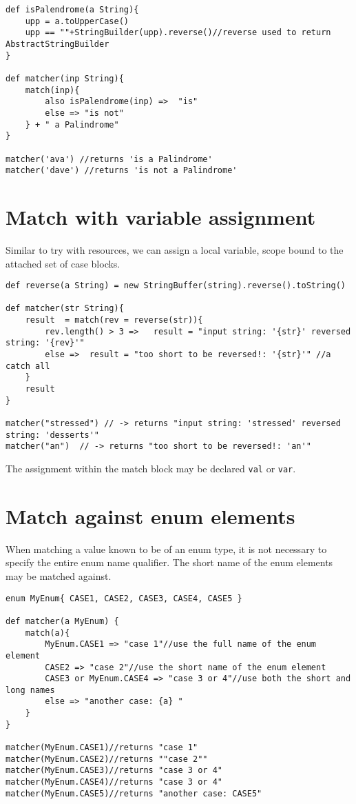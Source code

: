 \documentclass[conc-doc]{subfiles}
\begin{document}
\begin{lstlisting}
def isPalendrome(a String){
	upp = a.toUpperCase()
	upp == ""+StringBuilder(upp).reverse()//reverse used to return AbstractStringBuilder
}
	
def matcher(inp String){
	match(inp){
		also isPalendrome(inp) =>  "is" 
		else => "is not" 
	} + " a Palindrome"
}

matcher('ava') //returns 'is a Palindrome'
matcher('dave') //returns 'is not a Palindrome'
\end{lstlisting}

\section{Match with variable assignment}
Similar to try with resources, we can assign a local variable, scope bound to the attached set of case blocks.

\begin{lstlisting}
def reverse(a String) = new StringBuffer(string).reverse().toString()

def matcher(str String){
	result  = match(rev = reverse(str)){
		rev.length() > 3 =>   result = "input string: '{str}' reversed string: '{rev}'" 
		else =>  result = "too short to be reversed!: '{str}'" //a catch all
	}
	result
}

matcher("stressed") // -> returns "input string: 'stressed' reversed string: 'desserts'"
matcher("an")  // -> returns "too short to be reversed!: 'an'"
\end{lstlisting}

The assignment within the match block may be declared \lstinline{val} or \lstinline{var}.

\section{Match against enum elements}
When matching a value known to be of an enum type, it is not necessary to specify the entire enum name qualifier. The short name of the enum elements may be matched against.

\begin{lstlisting}
enum MyEnum{ CASE1, CASE2, CASE3, CASE4, CASE5 }

def matcher(a MyEnum) {
	match(a){
		MyEnum.CASE1 => "case 1"//use the full name of the enum element
		CASE2 => "case 2"//use the short name of the enum element
		CASE3 or MyEnum.CASE4 => "case 3 or 4"//use both the short and long names
		else => "another case: {a} " 
	}
}

matcher(MyEnum.CASE1)//returns "case 1"
matcher(MyEnum.CASE2)//returns ""case 2""
matcher(MyEnum.CASE3)//returns "case 3 or 4"
matcher(MyEnum.CASE4)//returns "case 3 or 4"
matcher(MyEnum.CASE5)//returns "another case: CASE5"
\end{lstlisting}
\end{document}
